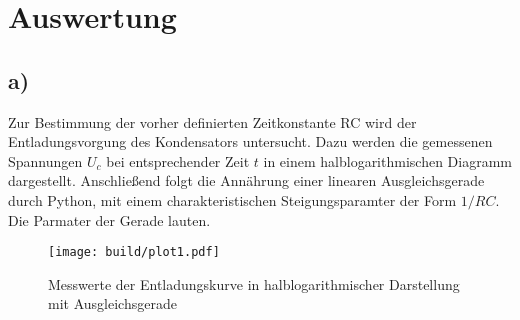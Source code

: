 \section{Auswertung}
\subsection{a)}  %
Zur Bestimmung der vorher definierten Zeitkonstante RC wird der Entladungsvorgung des Kondensators untersucht.
Dazu werden die gemessenen Spannungen $U_c$ bei entsprechender Zeit $t$ in einem halblogarithmischen Diagramm dargestellt.
Anschließend folgt die Annährung einer linearen Ausgleichsgerade durch Python, mit einem charakteristischen Steigungsparamter
der Form $1/RC$. Die Parmater der Gerade lauten.
 
\begin{figure}
    \centering 
    \texttt{[image: build/plot1.pdf]}
    \caption{Messwerte der Entladungskurve in halblogarithmischer Darstellung mit Ausgleichsgerade}
    \label{plt:plot1}
\end{figure} 